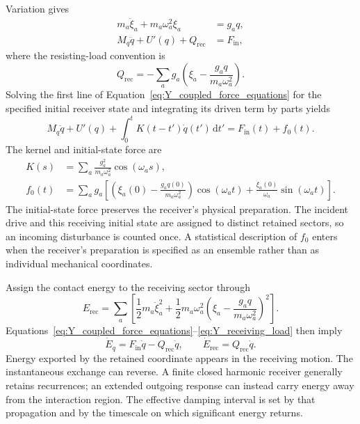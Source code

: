 Variation gives
\begin{align}
    m_a\ddot\xi_a+m_a\omega_a^2\xi_a&=g_aq,
    \nonumber\\
    M_q\ddot q+U'(q)+Q_{\mathrm{rec}}&=F_{\mathrm{in}},
    \label{eq:Y_coupled_force_equations}
\end{align}
where the resisting-load convention is
\begin{equation}
    Q_{\mathrm{rec}}
    =-\sum_a g_a\left(\xi_a-\frac{g_aq}{m_a\omega_a^2}\right).
    \label{eq:Y_receiving_load}
\end{equation}
Solving the first line of Equation~\eqref{eq:Y_coupled_force_equations} for the specified initial receiver state and integrating its driven term by parts yields
\begin{equation}
    \boxed{
    M_q\ddot q+U'(q)
    +\int_0^t K(t-t')\dot q(t')\,\mathrm dt'
    =F_{\mathrm{in}}(t)+f_0(t)
    }.
    \label{eq:Y_mechanical_memory}
\end{equation}
The kernel and initial-state force are
\begin{align}
    K(s)&=\sum_a\frac{g_a^2}{m_a\omega_a^2}\cos(\omega_as),
    \label{eq:Y_memory_kernel}\\
    f_0(t)&=\sum_a g_a\left[
        \left(\xi_a(0)-\frac{g_aq(0)}{m_a\omega_a^2}\right)
        \cos(\omega_at)
        +\frac{\dot\xi_a(0)}{\omega_a}\sin(\omega_at)
    \right].
    \label{eq:Y_initial_receiver_force}
\end{align}
The initial-state force preserves the receiver's physical preparation. The incident drive and this receiving initial state are assigned to distinct retained sectors, so an incoming disturbance is counted once. A statistical description of $f_0$ enters when the receiver's preparation is specified as an ensemble rather than as individual mechanical coordinates.

Assign the contact energy to the receiving sector through
\begin{equation}
    E_{\mathrm{rec}}
    =\sum_a\left[
        \frac12m_a\dot\xi_a^2
        +\frac12m_a\omega_a^2
        \left(\xi_a-\frac{g_aq}{m_a\omega_a^2}\right)^2
    \right].
\end{equation}
Equations~\eqref{eq:Y_coupled_force_equations}--\eqref{eq:Y_receiving_load} then imply
\begin{equation}
    \boxed{
    \dot E_q=F_{\mathrm{in}}\dot q-Q_{\mathrm{rec}}\dot q,
    \qquad
    \dot E_{\mathrm{rec}}=Q_{\mathrm{rec}}\dot q
    }.
    \label{eq:Y_coupled_energy_balance}
\end{equation}
Energy exported by the retained coordinate appears in the receiving motion. The instantaneous exchange can reverse. A finite closed harmonic receiver generally retains recurrences; an extended outgoing response can instead carry energy away from the interaction region. The effective damping interval is set by that propagation and by the timescale on which significant energy returns.


